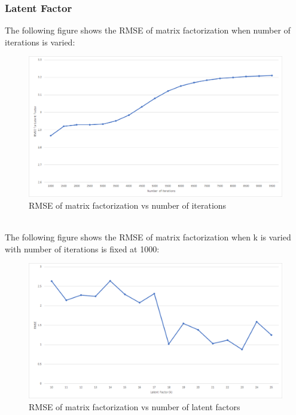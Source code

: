 \subsubsection{Latent Factor}
The following figure shows the RMSE of matrix factorization when number of iterations is varied:
\begin{figure}[!ht]
\centering
\includegraphics[width = \textwidth ]{fig/rmse_step.png}
\caption{RMSE of matrix factorization vs number of iterations}
\label{fig:rmse_step}
\end{figure}
\\
The following figure shows the RMSE of matrix factorization when k is varied with number of iterations is fixed at 1000:
\begin{figure}[!ht]
\centering
\includegraphics[width = \textwidth ]{fig/rmse_k.png}
\caption{RMSE of matrix factorization vs number of latent factors}
\label{fig:rmse_k}
\end{figure}